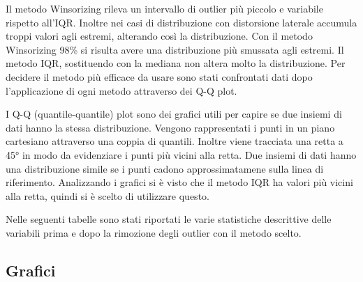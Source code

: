 \noindent
Il metodo Winsorizing rileva un intervallo di outlier più piccolo e variabile rispetto all'IQR. Inoltre nei casi di distribuzione con distorsione laterale accumula troppi valori agli estremi, alterando così la distribuzione. Con il metodo Winsorizing 98\% si risulta avere una distribuzione più smussata agli estremi. Il metodo IQR, sostituendo con la mediana non altera molto la distribuzione.
Per decidere il metodo più efficace da usare sono stati confrontati dati dopo l'applicazione di ogni metodo attraverso dei Q-Q plot.

\noindent
I Q-Q (quantile-quantile) plot sono dei grafici utili per capire se due insiemi di dati hanno la stessa distribuzione. Vengono rappresentati i punti in un piano cartesiano attraverso una coppia di quantili. Inoltre viene tracciata una retta a 45° in modo da evidenziare i punti più vicini alla retta. Due insiemi di dati hanno una distribuzione simile se i punti cadono approssimatamene sulla linea di riferimento.
Analizzando i grafici si è visto che il metodo IQR ha valori più vicini alla retta, quindi si è scelto di utilizzare questo.

\noindent
Nelle seguenti tabelle sono stati riportati le varie statistiche descrittive delle variabili prima e dopo la rimozione degli outlier con il metodo scelto.





\subsection{Grafici}

